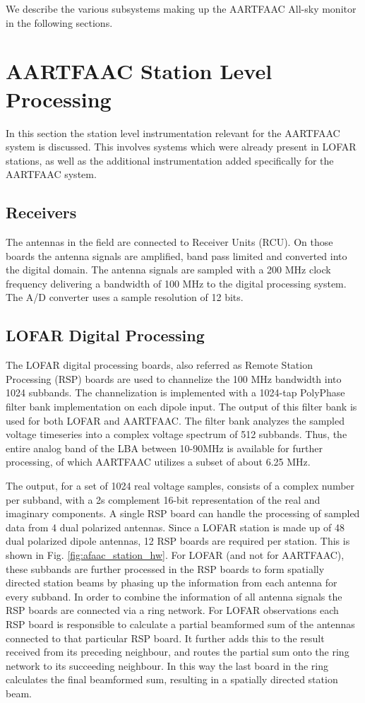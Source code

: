 \documentclass{ws-jai}
\begin{document}
We describe the various subsystems making up the AARTFAAC All-sky monitor in the
following sections.

\section {\label{sec:station_hardware} AARTFAAC Station Level Processing}
In  this section  the station  level instrumentation  relevant for  the AARTFAAC
system is discussed.  This involves systems which were already  present in LOFAR
stations, as well  as the additional instrumentation added  specifically for the
AARTFAAC system.
\subsection {Receivers}  The  antennas  in the  field  are connected  to
Receiver Units  (RCU). On those boards  the antenna signals are  amplified, band
pass limited  and converted into  the digital  domain.  The antenna  signals are
sampled with a 200 MHz clock frequency  delivering a bandwidth of 100 MHz to the
digital processing  system. The  A/D converter  uses a  sample resolution  of 12
bits.

\subsection  {LOFAR Digital  Processing}  The  LOFAR digital  processing
boards, also  referred as  Remote Station  Processing (RSP)  boards are  used to
channelize  the 100  MHz bandwidth  into 1024  subbands.  The  channelization is
implemented with a 1024-tap PolyPhase  filter bank implementation on each dipole
input. The output of  this filter bank is used for both  LOFAR and AARTFAAC. The
filter  bank analyzes  the sampled  voltage  timeseries into  a complex  voltage
spectrum  of 512  subbands. Thus,  the  entire analog  band of  the LBA  between
10-90MHz  is available  for further  processing,  of which  AARTFAAC utilizes  a
subset of about 6.25 MHz.

The output, for a set of 1024 real voltage samples, consists of a complex number
per  subband,  with a  2s  complement  16-bit  representation  of the  real  and
imaginary components.  A  single RSP board can handle the  processing of sampled
data from 4 dual polarized antennas. Since a LOFAR station is made up of 48 dual
polarized dipole antennas, 12 RSP boards are required per station. This is shown
in Fig.   \ref{fig:afaac_station_hw}.  For LOFAR  (and not for  AARTFAAC), these
subbands are  further processed  in the  RSP boards  to form  spatially directed
station  beams  by phasing  up  the  information  from  each antenna  for  every
subband. In  order to  combine the  information of all  antenna signals  the RSP
boards are connected  via a ring network. For LOFAR  observations each RSP board
is responsible to  calculate a partial beamformed sum of  the antennas connected
to that particular RSP board.  It further  adds this to the result received from
its preceding neighbour, and routes the partial sum onto the ring network to its
succeeding neighbour.   In this way  the last board  in the ring  calculates the
final beamformed sum, resulting in a spatially directed station beam.
\end{document}
